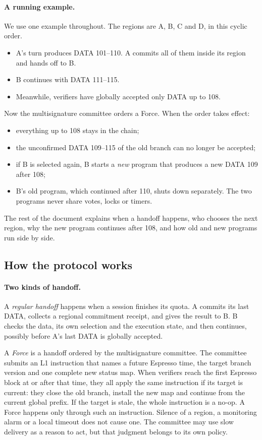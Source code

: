 \documentclass[11pt,a4paper]{article}
\newcommand{\defterm}[1]{\textcolor{rrBlue}{\textit{#1}}}
\newcounter{protocol}
\begin{document}
\paragraph{A running example.}
We use one example throughout. The regions are A, B, C and D, in this
cyclic order.
\begin{itemize}
\item A's turn produces DATA 101--110. A commits all of them inside its
region and hands off to B.
\item B continues with DATA 111--115.
\item Meanwhile, verifiers have globally accepted only DATA up to 108.
\end{itemize}
Now the multisignature committee orders a Force. When the order takes
effect:
\begin{itemize}
\item everything up to 108 stays in the chain;
\item the unconfirmed DATA 109--115 of the old branch can no longer be
accepted;
\item if B is selected again, B starts a \emph{new} program that produces
a new DATA 109 after 108;
\item B's old program, which continued after 110, shuts down separately.
The two programs never share votes, locks or timers.
\end{itemize}
The rest of the document explains when a handoff happens, who chooses
the next region, why the new program continues after 108, and how old
and new programs run side by side.

\subsection{How the protocol works}
\paragraph{Two kinds of handoff.}
A \defterm{regular handoff} happens when a session finishes its quota.
A commits its last DATA, collects a regional commitment receipt, and
gives the result to B. B checks the data, its own selection and the
execution state, and then continues, possibly before A's last
DATA is globally accepted.

A \defterm{Force} is a handoff ordered by the multisignature committee.
The committee submits an L1 instruction that names a future Espresso
time, the target branch version and one complete new status map. When
verifiers reach the first Espresso block at or after that time, they all
apply the same instruction if its target is current: they close the old
branch, install the new map and continue from the current global prefix.
If the target is stale, the whole instruction is a no-op. A Force happens only
through such an instruction. Silence of a region, a monitoring alarm or
a local timeout does not cause one. The committee may use slow delivery
as a reason to act, but that judgment belongs to its own policy.
\end{document}
